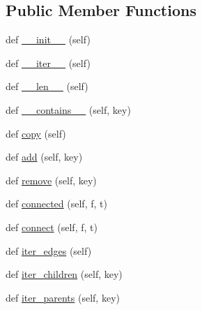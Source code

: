 \subsection*{Public Member Functions}
\begin{DoxyCompactItemize}
\item 
def \hyperlink{classpip_1_1__vendor_1_1resolvelib_1_1structs_1_1DirectedGraph_a19c794212d0e7fe7cff5c77828e68bc1}{\+\_\+\+\_\+init\+\_\+\+\_\+} (self)
\item 
def \hyperlink{classpip_1_1__vendor_1_1resolvelib_1_1structs_1_1DirectedGraph_ae0c0a4e09feb878d13598f724517cfe5}{\+\_\+\+\_\+iter\+\_\+\+\_\+} (self)
\item 
def \hyperlink{classpip_1_1__vendor_1_1resolvelib_1_1structs_1_1DirectedGraph_a3b97b0ffafd977854b304d364eca85a0}{\+\_\+\+\_\+len\+\_\+\+\_\+} (self)
\item 
def \hyperlink{classpip_1_1__vendor_1_1resolvelib_1_1structs_1_1DirectedGraph_a66880557c23652e6efd59d418870906e}{\+\_\+\+\_\+contains\+\_\+\+\_\+} (self, key)
\item 
def \hyperlink{classpip_1_1__vendor_1_1resolvelib_1_1structs_1_1DirectedGraph_ab09f3a6d77cd6cd7054fd4910e89ce9a}{copy} (self)
\item 
def \hyperlink{classpip_1_1__vendor_1_1resolvelib_1_1structs_1_1DirectedGraph_a265181f1e6893b0836a8f01b10ac3a62}{add} (self, key)
\item 
def \hyperlink{classpip_1_1__vendor_1_1resolvelib_1_1structs_1_1DirectedGraph_ae05e9cfa2be4c2864bcd2c9ea8457e29}{remove} (self, key)
\item 
def \hyperlink{classpip_1_1__vendor_1_1resolvelib_1_1structs_1_1DirectedGraph_adb6e861441201ea09cccfad1e38f74d0}{connected} (self, f, t)
\item 
def \hyperlink{classpip_1_1__vendor_1_1resolvelib_1_1structs_1_1DirectedGraph_a2da7b0968105a257ecc64afea06a1754}{connect} (self, f, t)
\item 
def \hyperlink{classpip_1_1__vendor_1_1resolvelib_1_1structs_1_1DirectedGraph_a75ea336a0bd7c5ce6522b0f4a3e64568}{iter\+\_\+edges} (self)
\item 
def \hyperlink{classpip_1_1__vendor_1_1resolvelib_1_1structs_1_1DirectedGraph_a69bbe3c41bd856c3c8a198ce9044dd95}{iter\+\_\+children} (self, key)
\item 
def \hyperlink{classpip_1_1__vendor_1_1resolvelib_1_1structs_1_1DirectedGraph_abc6bb2a20cfa843cea598fd5a08e45ec}{iter\+\_\+parents} (self, key)
\end{DoxyCompactItemize}


